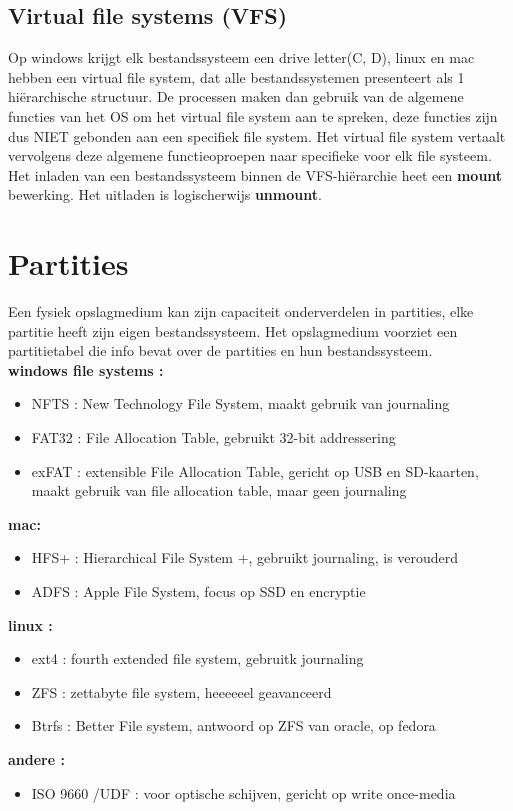 \documentclass{report}
\begin{document}
   			\subsection{Virtual file systems (VFS)}
   				Op windows krijgt elk bestandssysteem een drive letter(C, D), linux en mac hebben een virtual file system, dat alle bestandssystemen presenteert als 1 hiërarchische structuur. De processen maken dan gebruik van de algemene functies van het OS om het virtual file system aan te spreken, deze functies zijn dus NIET gebonden aan een specifiek file system. Het virtual file system vertaalt vervolgens deze algemene functieoproepen naar specifieke voor elk file systeem. Het inladen van een bestandssysteem binnen de VFS-hiërarchie heet een \textbf{mount} bewerking. Het uitladen is logischerwijs \textbf{unmount}.
   		\section{Partities}
   			Een fysiek opslagmedium kan zijn capaciteit onderverdelen in partities, elke partitie heeft zijn eigen bestandssysteem. Het opslagmedium voorziet een partitietabel die info bevat over de partities en hun bestandssysteem.
   			\\
   			\textbf{windows file systems : }
   			\begin{itemize}
   				\item NFTS : New Technology File System, maakt gebruik van journaling
   				\item FAT32 : File Allocation Table, gebruikt 32-bit addressering
   				\item exFAT : extensible File Allocation Table, gericht op USB en SD-kaarten, maakt gebruik van file allocation table, maar geen journaling
   			\end{itemize}
   			\textbf{mac: }
   			\begin{itemize}
   				\item HFS+ : Hierarchical File System +, gebruikt journaling, is verouderd
   				\item ADFS : Apple File System, focus op SSD en encryptie
   			\end{itemize}
   			\textbf{linux : }
   			\begin{itemize}
   				\item ext4 : fourth extended file system, gebruitk journaling
   				\item ZFS : zettabyte file system, heeeeeel geavanceerd
   				\item Btrfs : Better File system, antwoord op ZFS van oracle, op fedora
   			\end{itemize}
   			\textbf{andere :}
   			\begin{itemize}
   				\item ISO 9660 /UDF : voor optische schijven, gericht op write once-media
   			\end{itemize}
\end{document}
